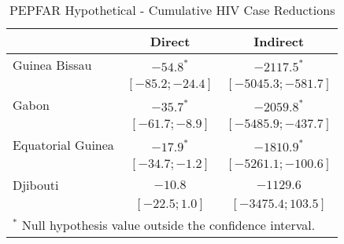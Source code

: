 
\usepackage{booktabs}

\begin{table}
\begin{center}
\begin{tabular}{l c c}
\toprule
 & Direct & Indirect \\
\midrule
Guinea Bissau     & $-54.8^{*}$       & $-2117.5^{*}$        \\
                  & $ [-85.2; -24.4]$ & $ [-5045.3; -581.7]$ \\
Gabon             & $-35.7^{*}$       & $-2059.8^{*}$        \\
                  & $ [-61.7;  -8.9]$ & $ [-5485.9; -437.7]$ \\
Equatorial Guinea & $-17.9^{*}$       & $-1810.9^{*}$        \\
                  & $ [-34.7;  -1.2]$ & $ [-5261.1; -100.6]$ \\
Djibouti          & $-10.8$           & $-1129.6$            \\
                  & $ [-22.5;   1.0]$ & $ [-3475.4;  103.5]$ \\
\bottomrule
\multicolumn{3}{l}{\scriptsize{$^*$ Null hypothesis value outside the confidence interval.}}
\end{tabular}
\caption{PEPFAR Hypothetical - Cumulative HIV Case Reductions}
\label{table:ideal-cumulative}
\end{center}
\end{table}
